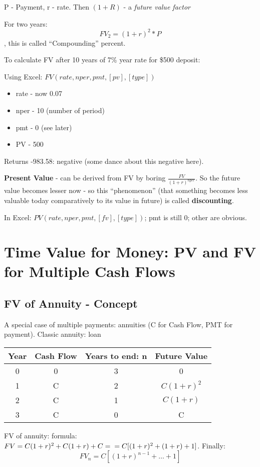 \documentclass{scrartcl}
\begin{document}
P - Payment, r - rate. Then $(1 + R)$ - a {\it future value factor}

For two years: $$FV_2 = (1 + r)^2 * P$$, this is called ``Compounding'' percent.

To calculate FV after 10 years of 7\% year rate for \$500 deposit:

Using Excel: $FV(rate, nper, pmt, [pv], [type])$
\begin{itemize}
\item rate - now 0.07
\item nper - 10 (number of period)
\item pmt - 0 (see later)
\item PV - 500
\end{itemize}
Returns -983.58: negative (some dance about this negative here).

{\bf Present Value} - can be derived from FV by boring
$\frac{FV}{(1+r)^{nper}}$. So the future value becomes lesser now - so this
``phenomenon'' (that something becomes less valuable today comparatively to its
value in future) is called {\bf discounting}.

In Excel: $PV(rate, nper, pmt, [fv],[type])$; pmt is still 0; other are obvious.

\section {Time Value for Money: PV and FV for Multiple Cash Flows}
\label{sec:3}

\subsection{FV of Annuity - Concept}
\label{sec:3-2}

A special case of multiple payments: annuities (C for Cash Flow, PMT for
payment). Classic annuity: loan

\begin{tabular}{c|c|c|c}
  Year & Cash Flow & Years to end: n & Future Value \\
  \hline
  0 & 0 & 3 & 0 \\
  1 & C & 2 & $C(1 + r)^2$ \\
  2 & C & 1 & $C(1 + r)$ \\
  3 & C & 0 & C
\end{tabular}

FV of annuity: formula: $FV = C(1 + r)^2 + C(1+r) + C = \\
= C[(1+r)^2 + (1+r) + 1]$. Finally: $$FV_n = C[(1+r)^{n-1} + \dots + 1]$$
\end{document}
